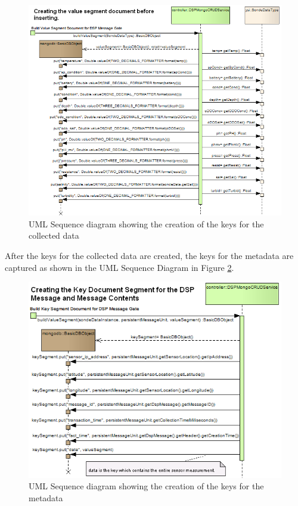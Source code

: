 \begin{figure}[!h]
  \centering
  \includegraphics[scale=0.6]{../diagrams/From-Creating-Value-Segment-Sequence}
  \caption{UML Sequence diagram showing the creation of the keys for the
  collected data}
  \label{fig:From-Creating-Value-Segment-Sequence}
\end{figure}

\newpage

After the keys for the collected data are created, the keys for the metadata
are captured as shown in the UML Sequence Diagram in Figure
\ref{fig:From-Creating-Key-Segment-Sequence}.

\begin{figure}[!h]
  \centering
  \includegraphics[scale=0.65]{../diagrams/From-Creating-Key-Segment-Sequence}
  \caption{UML Sequence diagram showing the creation of the keys for the
  metadata}
  \label{fig:From-Creating-Key-Segment-Sequence}
\end{figure}

